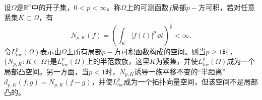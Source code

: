 \begin{example}
	设$\Omega$是$\mathbb{R}^{n}$中的开子集，$0< p<\infty$。称$\Omega$上的可测函数$f$局部$p-$方可积，若对任意紧集$K\subset \Omega$，有
	\begin{equation*}
		N_{p,K}(f)=\left(\int_{K}|f(t)|^{p}\,\dd t \right)^{\frac{1}{p}}<\infty.
	\end{equation*}
	令$L_{loc}^{p}(\Omega)$表示由$\Omega$上所有局部$p-$方可积函数构成的空间。则当$p\geq 1$时，$\{N_{p,K}:K\subset\Omega\}$是$L_{loc}^{p}(\Omega)$上的半范数族，这里$K$为紧集，并使$L_{loc}^{p}(\Omega)$成为一个局部凸空间。另一方面，当$p<1$时，$N_{p,K}$诱导一族平移不变的“半距离”$d_{p,K}(f,g)=N_{p,K}(f-g)$，并使$L_{loc}^{p}$成为一个拓扑向量空间，但该空间不是局部凸的。
\end{example}






























